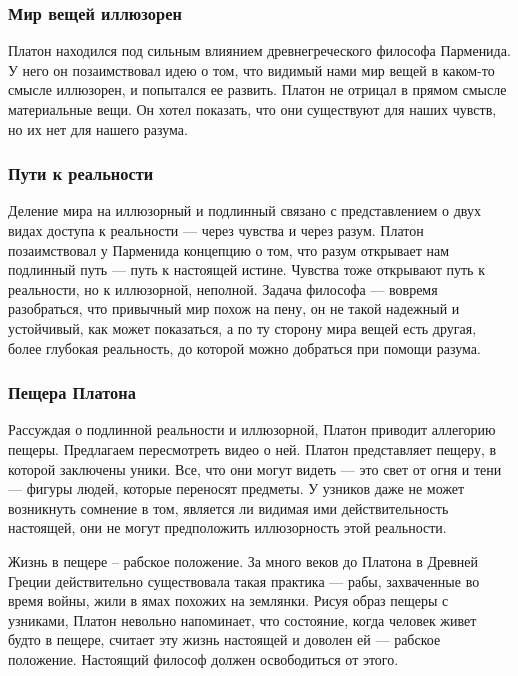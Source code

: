 \documentclass[a4paper, 14pt]{extreport}
\begin{document}
\subsubsection{Мир вещей иллюзорен}

Платон находился под сильным влиянием древнегреческого философа
Парменида. У него он позаимствовал идею о том, что видимый нами мир
вещей в каком-то смысле иллюзорен, и попытался ее развить. Платон не
отрицал в прямом смысле материальные вещи. Он хотел показать, что они
существуют для наших чувств, но их нет для нашего разума.

\subsubsection{Пути к реальности}

Деление мира на иллюзорный и подлинный связано с представлением о двух
видах доступа к реальности --- через чувства и через разум. Платон
позаимствовал у Парменида концепцию о том, что разум открывает нам
подлинный путь --- путь к настоящей истине. Чувства тоже открывают путь
к реальности, но к иллюзорной, неполной. Задача философа --- вовремя
разобраться, что привычный мир похож на пену, он не такой надежный и
устойчивый, как может показаться, а по ту сторону мира вещей есть
другая, более глубокая реальность, до которой можно добраться при помощи
разума.

\subsubsection{Пещера Платона}

Рассуждая о подлинной реальности и иллюзорной, Платон приводит аллегорию
пещеры. Предлагаем пересмотреть видео о ней. Платон представляет пещеру,
в которой заключены уники. Все, что они могут видеть --- это свет от
огня и тени --- фигуры людей, которые переносят предметы. У узников даже
не может возникнуть сомнение в том, является ли видимая ими
действительность настоящей, они не могут предположить иллюзорность этой
реальности.

Жизнь в пещере -- рабское положение. За много веков до Платона в Древней
Греции действительно существовала такая практика --- рабы, захваченные
во время войны, жили в ямах похожих на землянки. Рисуя образ пещеры с
узниками, Платон невольно напоминает, что состояние, когда человек живет
будто в пещере, считает эту жизнь настоящей и доволен ей --- рабское
положение. Настоящий философ должен освободиться от этого.
\end{document}
